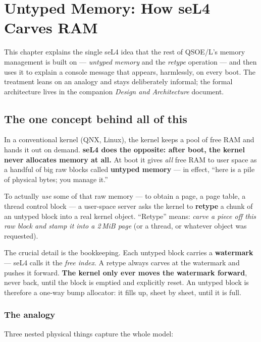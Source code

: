 \chapter{Untyped Memory: How seL4 Carves RAM}

This chapter explains the single seL4 idea that the rest of QSOE/L's
memory management is built on --- \emph{untyped memory} and the
\emph{retype} operation --- and then uses it to explain a console
message that appears, harmlessly, on every boot. The treatment leans
on an analogy and stays deliberately informal; the formal architecture
lives in the companion \emph{Design and Architecture} document.

\section{The one concept behind all of this}

In a conventional kernel (QNX, Linux), the kernel keeps a pool of free
RAM and hands it out on demand. \textbf{seL4 does the opposite: after
boot, the kernel never allocates memory at all.} At boot it gives
\emph{all} free RAM to user space as a handful of big raw blocks called
\textbf{untyped memory} --- in effect, ``here is a pile of physical
bytes; you manage it.''

To actually \emph{use} some of that raw memory --- to obtain a page, a
page table, a thread control block --- a user-space server asks the
kernel to \textbf{retype} a chunk of an untyped block into a real
kernel object. ``Retype'' means: \emph{carve a piece off this raw block
and stamp it into a 2\,MiB page} (or a thread, or whatever object was
requested).

The crucial detail is the bookkeeping. Each untyped block carries a
\textbf{watermark} --- seL4 calls it the \emph{free index}. A retype
always carves at the watermark and pushes it forward. \textbf{The
kernel only ever moves the watermark forward}, never back, until the
block is emptied and explicitly reset. An untyped block is therefore a
one-way bump allocator: it fills up, sheet by sheet, until it is full.

\subsection{The analogy}

Three nested physical things capture the whole model:

